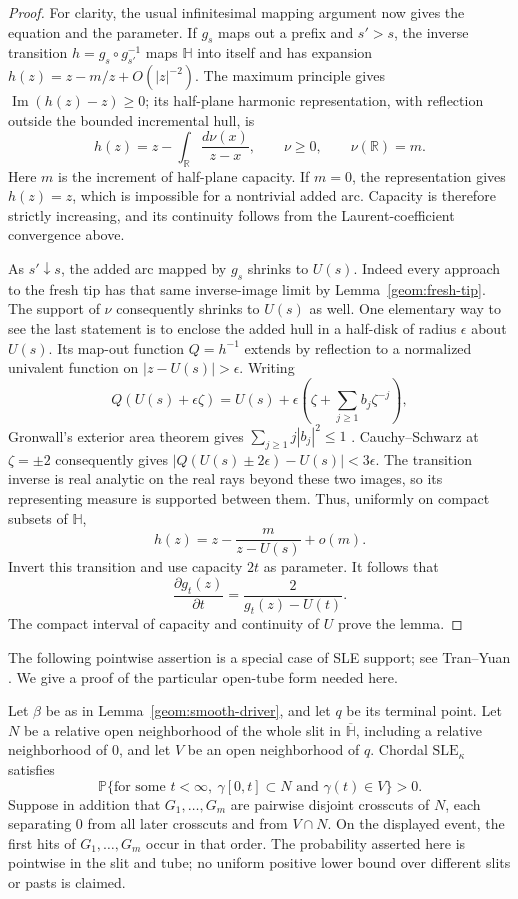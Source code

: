 \begin{proof}
For clarity, the usual infinitesimal mapping argument now gives the
equation and the parameter.  If $g_s$ maps out a prefix and $s'>s$,
the inverse transition $h=g_s\circ g_{s'}^{-1}$ maps $\mathbb H$
into itself and has expansion $h(z)=z-m/z+O(|z|^{-2})$.  The
maximum principle gives $\operatorname{Im}(h(z)-z)\ge0$; its
half-plane harmonic representation, with reflection outside the
bounded incremental hull, is
\[
 h(z)=z-\int_{\mathbb R}\frac{d\nu(x)}{z-x},
 \qquad \nu\ge0,\qquad \nu(\mathbb R)=m.
\]
Here $m$ is the increment of half-plane capacity.  If $m=0$, the
representation gives $h(z)=z$, which is impossible for a nontrivial
added arc.  Capacity is therefore strictly increasing, and its
continuity follows from the Laurent-coefficient convergence above.

As $s'\downarrow s$, the added arc mapped by $g_s$ shrinks to $U(s)$.
Indeed every approach to the fresh tip has that same inverse-image
limit by Lemma~\ref{geom:fresh-tip}.  The support of $\nu$ consequently
shrinks to $U(s)$ as well.  One elementary way to see the last statement
is to enclose the added hull in a half-disk of radius $\epsilon$
about $U(s)$.  Its map-out function $Q=h^{-1}$ extends by reflection
to a normalized univalent function on $|z-U(s)|>\epsilon$.
Writing
\[
 Q(U(s)+\epsilon\zeta)
   =U(s)+\epsilon\left(\zeta+
                         \sum_{j\ge1}b_j\zeta^{-j}\right),
\]
Gronwall's exterior area theorem gives $\sum_{j\ge1}j|b_j|^2\le1$
\cite[Theorem~3.2.1 and Corollary~3.2.2, pp.~37--38]{beliaev2015}.
Cauchy--Schwarz at $\zeta=\pm2$ consequently gives
$|Q(U(s)\pm2\epsilon)-U(s)|<3\epsilon$.
The transition inverse is real analytic on the real rays beyond
these two images, so its representing measure is supported between
them.
Thus, uniformly on compact subsets of $\mathbb H$,
\[
 h(z)=z-\frac{m}{z-U(s)}+o(m).
\]
Invert this transition and use capacity $2t$ as parameter.  It follows
that
\[
 \frac{\partial g_t(z)}{\partial t}
       =\frac{2}{g_t(z)-U(t)}.
\]
The compact interval of capacity and continuity of $U$ prove the lemma.
\end{proof}

The following pointwise assertion is a special case of SLE support;
see Tran--Yuan \cite[Theorem~1.1 and Corollary~1.2]{tranyuan2020}.
We give a proof of the particular open-tube form needed here.

\begin{lemma}
\label{geom:slit-support}
Let $\beta$ be as in Lemma~\ref{geom:smooth-driver}, and let $q$ be its
terminal point.  Let $N$ be a relative open neighborhood of the whole
slit in $\overline{\mathbb H}$, including a relative neighborhood of
$0$, and let $V$ be an open neighborhood of $q$.  Chordal
$\mathrm{SLE}_{\kappa}$ satisfies
\[
 \mathbb P\{\text{for some }t<\infty,
       \ \gamma[0,t]\subset N\text{ and }\gamma(t)\in V\}>0.
\]
Suppose in addition that $G_1,\ldots,G_m$ are pairwise disjoint crosscuts
of $N$, each separating $0$ from all later crosscuts and from $V\cap N$.
On the displayed
event, the first hits of $G_1,\ldots,G_m$ occur in that order.
The probability asserted here is pointwise in the slit and tube; no
uniform positive lower bound over different slits or pasts is claimed.
\end{lemma}

